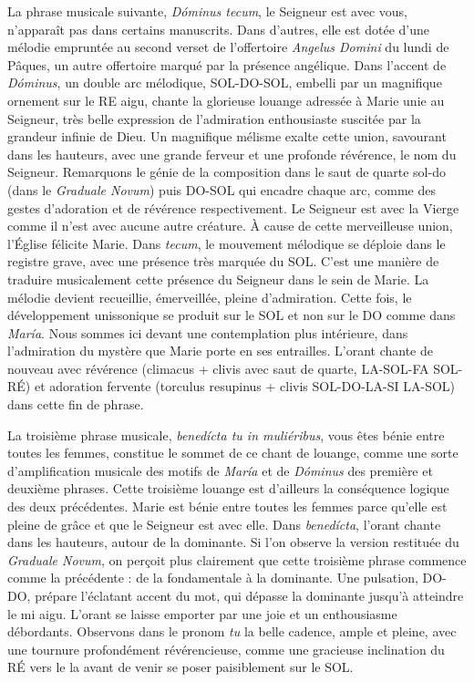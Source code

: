 \documentclass[Session2026.tex]{subfiles}
\begin{document}
La phrase musicale suivante, \emph{Dóminus tecum}, le Seigneur est avec
vous, n'apparaît pas dans certains manuscrits. Dans d'autres, elle est
dotée d'une mélodie empruntée au second verset de l'offertoire
\emph{Angelus Domini} du lundi de Pâques, un autre offertoire marqué par
la présence angélique. Dans l'accent de \emph{Dóminus}, un double arc
mélodique, SOL-DO-SOL, embelli par un magnifique ornement sur le RE
aigu, chante la glorieuse louange adressée à Marie unie au Seigneur,
très belle expression de l'admiration enthousiaste suscitée par la
grandeur infinie de Dieu. Un magnifique mélisme exalte cette union,
savourant dans les hauteurs, avec une grande ferveur et une profonde
révérence, le nom du Seigneur. Remarquons le génie de la composition
dans le saut de quarte sol-do (dans le \emph{Graduale Novum}) puis
DO-SOL qui encadre chaque arc, comme des gestes d'adoration et de
révérence respectivement. Le Seigneur est avec la Vierge comme il n'est
avec aucune autre créature. À cause de cette merveilleuse union,
l'Église félicite Marie. Dans \emph{tecum}, le mouvement mélodique se
déploie dans le registre grave, avec une présence très marquée du SOL.
C'est une manière de traduire musicalement cette présence du Seigneur
dans le sein de Marie. La mélodie devient recueillie, émerveillée,
pleine d'admiration. Cette fois, le développement unissonique se produit
sur le SOL et non sur le DO comme dans \emph{María}. Nous sommes ici
devant une contemplation plus intérieure, dans l'admiration du mystère
que Marie porte en ses entrailles. L'orant chante de nouveau avec
révérence (climacus + clivis avec saut de quarte, LA-SOL-FA SOL-RÉ) et
adoration fervente (torculus resupinus + clivis SOL-DO-LA-SI LA-SOL)
dans cette fin de phrase.

La troisième phrase musicale, \emph{benedícta tu in muliéribus}, vous
êtes bénie entre toutes les femmes, constitue le sommet de ce chant de
louange, comme une sorte d'amplification musicale des motifs de
\emph{María} et de \emph{Dóminus} des première et deuxième phrases.
Cette troisième louange est d'ailleurs la conséquence logique des deux
précédentes. Marie est bénie entre toutes les femmes parce qu'elle est
pleine de grâce et que le Seigneur est avec elle. Dans \emph{benedícta},
l'orant chante dans les hauteurs, autour de la dominante. Si l'on
observe la version restituée du \emph{Graduale Novum}, on perçoit plus
clairement que cette troisième phrase commence comme la précédente : de
la fondamentale à la dominante. Une pulsation, DO-DO, prépare l'éclatant
accent du mot, qui dépasse la dominante jusqu'à atteindre le mi aigu.
L'orant se laisse emporter par une joie et un enthousiasme débordants.
Observons dans le pronom \emph{tu} la belle cadence, ample et pleine,
avec une tournure profondément révérencieuse, comme une gracieuse
inclination du RÉ vers le la avant de venir se poser paisiblement sur le
SOL.
\end{document}
